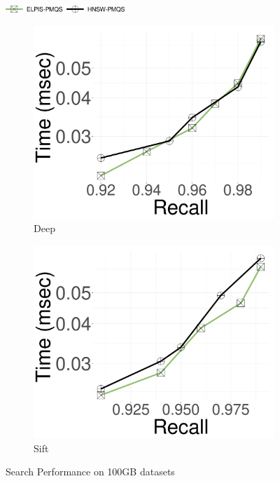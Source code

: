  \begin{figure}[!htb]
		\captionsetup{justification=centering}
		\captionsetup[subfigure]{justification=centering}
  	\centering
   			\includegraphics[width=0.4\textwidth]{../img/elpis2/pre/legendpre.png}
      
        	\centering
		\begin{subfigure}{0.3\textwidth}
			\includegraphics[width=\textwidth]{../img/elpis2/100GB/deep_Time.png}
			\caption{Deep}  
		\label{fig:elpis:query:performance:100GB:deep:10NN}
		\end{subfigure}
\hspace{0.4cm}
		\begin{subfigure}{0.3\textwidth}
			\includegraphics[width=\textwidth]{../img/elpis2/100GB/sift_Time.png}
			\caption{Sift}  
		\label{fig:elpis:query:performance:100GB:sift:10NN}
		\end{subfigure}
		\caption{{Search Performance on 100GB datasets}}	
		\label{fig:elpis2:nleafsize:100GB}
	\end{figure}
 
